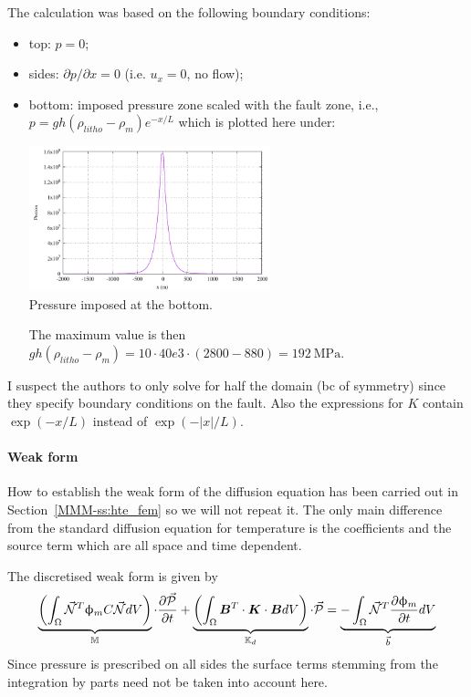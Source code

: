 The calculation was based on the following boundary conditions: 
\begin{itemize}
\item top: $p=0$;
\item sides:  $\partial p/\partial x =0$ (i.e. $u_x=0$, no flow);
\item bottom: imposed pressure zone scaled
with the fault zone, i.e., $p = g h (\rho_{litho} -\rho_m) e^{-x/L}$ which is plotted here under: 
\begin{center}
\includegraphics[width=7cm]{python_codes/fieldstone_126/images/pbottom}\\
{\captionfont Pressure imposed at the bottom.}
\end{center}
The maximum value is then $g h (\rho_{litho} -\rho_m) 
=10\cdot 40e3 \cdot(2800-880)=192~\si{\mega\pascal}$.

\end{itemize}
I suspect the authors to only solve for half the domain (bc of symmetry) since they 
specify boundary conditions on the fault. Also the expressions for $K$ contain $\exp(-x/L)$
instead of $\exp(-|x|/L)$.



\paragraph{Weak form}

How to establish the weak form of the diffusion equation has been 
carried out in Section~\ref{MMM-ss:hte_fem} so we will not repeat it. 
The only main difference from the standard diffusion equation for temperature
is the coefficients and the source term which are all space and time dependent.

The discretised weak form is given by
\[
\underbrace{
\left( \int_\Omega \vec{{\mathcal{N}}}^T \upphi_m C  \vec{{\mathcal{N}}} dV  \right)
}_{{\mathbb{M}}}
 \cdot \frac{\partial \vec{\cal P}}{\partial t}
+
\underbrace{
\left( \int_\Omega {\bm B}^T \cdot  {\bm K} \cdot {\bm B} dV \right)
}_{{{\mathbb{K}}}_d}
 \cdot \vec{\cal P}
=
\underbrace{
-
\int_\Omega \vec{{\mathcal{N}}}^T  \frac{\partial \upphi_m}{\partial t} dV
}_{\vec{b}}
\]
Since pressure is prescribed on all sides the surface terms stemming from the integration by parts
need not be taken into account here.

